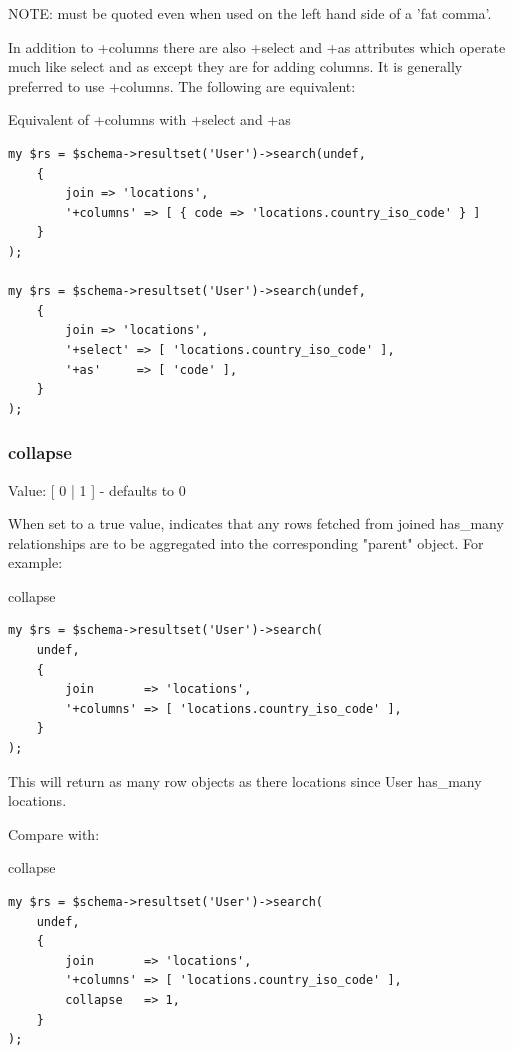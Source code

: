 NOTE: must be quoted even when used on the left hand side of a 'fat comma'.

In addition to +columns there are also +select and +as attributes which
operate much like select and as except they are for adding columns. It is
generally preferred to use +columns. The following are equivalent:

\begin{frame}[fragile]{Equivalent of +columns with +select and +as}
\begin{lstlisting}
my $rs = $schema->resultset('User')->search(undef,
    {
        join => 'locations',
        '+columns' => [ { code => 'locations.country_iso_code' } ]
    }
);

my $rs = $schema->resultset('User')->search(undef,
    {
        join => 'locations',
        '+select' => [ 'locations.country_iso_code' ],
        '+as'     => [ 'code' ],
    }
);
\end{lstlisting}
\end{frame}

\subsubsection{collapse}

Value: [ 0 | 1 ] - defaults to 0

When set to a true value, indicates that any rows fetched from joined
has\_many relationships are to be aggregated into the corresponding "parent"
object. For example:

\begin{frame}[fragile]{collapse}
\begin{lstlisting}
my $rs = $schema->resultset('User')->search(
    undef,
    {
        join       => 'locations',
        '+columns' => [ 'locations.country_iso_code' ],
    }
);
\end{lstlisting}
\end{frame}

This will return as many row objects as there locations since User has\_many
locations.

Compare with:

\begin{frame}[fragile]{collapse}
\begin{lstlisting}
my $rs = $schema->resultset('User')->search(
    undef,
    {
        join       => 'locations',
        '+columns' => [ 'locations.country_iso_code' ],
        collapse   => 1,
    }
);
\end{lstlisting}
\end{frame}

